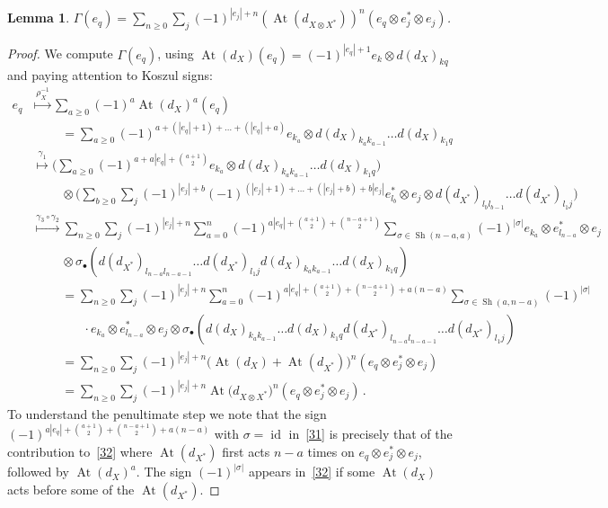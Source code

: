 \documentclass{compositio}
\newtheorem{lemma}[theorem]{Lemma}
\theoremstyle{definition}
\numberwithin{equation}{section}
\DeclareMathOperator{\At}{At}
\DeclareMathOperator{\Sh}{Sh}
\begin{document}
\begin{lemma}
$\Gamma(e_q) = \sum_{n\geq 0} \sum_j (-1)^{|e_j| + n} (\At(d_{X\otimes X^*}))^n(e_q \otimes e_j^* \otimes e_j)$. 
\end{lemma}

\begin{proof}
We compute $\Gamma(e_q)$, using $\At(d_X)(e_q) = (-1)^{|e_q|+1} e_k \otimes d(d_X)_{kq}$ and paying attention to Koszul signs: 
\begin{align}
e_q & \stackrel{\rho_X^{-1}}{\longmapsto} \sum_{a\geq 0} (-1)^a \At(d_X)^a(e_q) \nonumber \\
& \qquad\; = \sum_{a\geq 0} (-1)^{a + (|e_q|+1)+\ldots+(|e_q|+a)} e_{k_a} \otimes d(d_X)_{k_a k_{a-1}} \ldots d(d_X)_{k_1 q} \nonumber \\
& \stackrel{\gamma_1}{\longmapsto} \Big( \sum_{a\geq 0} (-1)^{a + a|e_q| + {a+1\choose 2}} e_{k_a} \otimes d(d_X)_{k_a k_{a-1}} \ldots d(d_X)_{k_1 q} \Big) \nonumber \\
& \qquad\; \otimes \Big( \sum_{b\geq 0} \sum_j (-1)^{|e_j|+b} (-1)^{(|e_j|+1)+\ldots+(|e_j|+b) + b|e_j|} e^*_{l_b} \otimes e_j \otimes d(d_{X^*})_{l_b l_{b-1}} \ldots d(d_{X^*})_{l_1 j} \Big) \nonumber \\
& \stackrel{\gamma_3 \circ \gamma_2}{\longmapsto} \sum_{n\geq 0} \sum_j (-1)^{|e_j|+n} \sum_{a=0}^n(-1)^{a|e_q| + {a+1\choose 2} + {n-a+1\choose 2}} \sum_{\sigma \in \Sh(n-a,a)} (-1)^{|\sigma|} e_{k_a} \otimes e^*_{l_{n-a}} \otimes e_j \nonumber \\
& \qquad\;   \otimes \sigma_\bullet \left( d(d_{X^*})_{l_{n-a} l_{n-a-1}} \ldots d(d_{X^*})_{l_1 j} d(d_X)_{k_a k_{a-1}} \ldots d(d_X)_{k_1 q} \right) \nonumber \\
& \qquad\; =  \sum_{n\geq 0} \sum_j (-1)^{|e_j|+n} \sum_{a=0}^n (-1)^{a|e_q| + {a+1\choose 2} + {n-a+1\choose 2} + a(n-a)} \sum_{\sigma \in \Sh(a,n-a)} (-1)^{|\sigma|}  \label{31} \\
& \qquad\qquad \cdot e_{k_a} \otimes e^*_{l_{n-a}} \otimes e_j \otimes \sigma_\bullet \left( d(d_X)_{k_a k_{a-1}} \ldots d(d_X)_{k_1 q} d(d_{X^*})_{l_{n-a} l_{n-a-1}} \ldots d(d_{X^*})_{l_1 j} \right) \nonumber \\
& \qquad\; =  \sum_{n\geq 0} \sum_j (-1)^{|e_j|+n} \big( \At(d_X) + \At(d_{X^*}) \big)^n (e_q \otimes e^*_j \otimes e_j) \label{32} \\
& \qquad\; =  \sum_{n\geq 0} \sum_j (-1)^{|e_j|+n} \At(d_{X\otimes X^*} \big)^n (e_q \otimes e^*_j \otimes e_j) \, . \nonumber
\end{align}
To understand the penultimate step we note that the sign $(-1)^{a|e_q| + {a+1\choose 2} + {n-a+1\choose 2} + a(n-a)}$ with $\sigma=\operatorname{id}$ in~\eqref{31} is precisely that of the contribution to~\eqref{32} where $\At(d_{X^*})$ first acts $n-a$ times on $e_q\otimes e^*_j\otimes e_j$, followed by $\At(d_X)^a$. The sign $(-1)^{|\sigma|}$ appears in~\eqref{32} if some $\At(d_X)$ acts before some of the $\At(d_{X^*})$. 
\end{proof}
\end{document}
